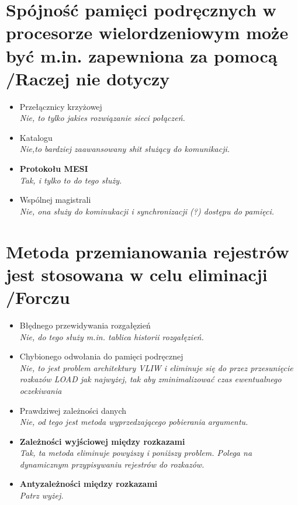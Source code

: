 \documentclass[a4paper,twoside]{article}
\begin{document}
\section{Spójność pamięci podręcznych w procesorze wielordzeniowym może być m.in. zapewniona za pomocą {\small /Raczej nie dotyczy}}
	\begin{itemize}
    \item Przełącznicy krzyżowej\\
    {\small \emph{Nie, to tylko jakies rozwiązanie sieci połączeń.}}
    \item Katalogu\\
    {\small \emph{Nie,to bardziej zaawansowany shit służący do komunikacji.}}
    \item \textbf{Protokołu MESI}\\
    {\small \emph{Tak, i tylko to do tego służy.}}
    \item Wspólnej magistrali\\
    {\small \emph{Nie, ona służy do kominukacji i synchronizacji (?) dostępu do pamięci.}}
    \end{itemize}

\section{Metoda przemianowania rejestrów jest stosowana w celu eliminacji {\small /Forczu}}
	\begin{itemize}
    \item Błędnego przewidywania rozgałęzień\\
    {\small \emph{Nie, do tego służy m.in. tablica historii rozgałęzień.}}
    \item Chybionego odwołania do pamięci podręcznej\\
    {\small \emph{Nie, to jest problem architektury VLIW i eliminuje się do przez przesunięcie rozkazów LOAD jak najwyżej, tak aby zminimalizować czas ewentualnego oczekiwania}}
    \item Prawdziwej zależności danych\\
    {\small \emph{Nie, od tego jest metoda wyprzedzającego pobierania argumentu.}}
    \item \textbf{Zależności wyjściowej między rozkazami}\\
    {\small \emph{Tak, ta metoda eliminuje powyższy i poniższy problem. Polega na dynamicznym przypisywaniu rejestrów do rozkazów.}}
    \item \textbf{Antyzależności między rozkazami}\\
    {\small \emph{Patrz wyżej.}}
    
    \end{itemize}
\end{document}
